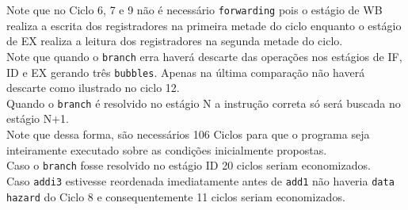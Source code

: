 \documentclass{article}
\begin{document}
Note que no Ciclo 6, 7 e 9 não é necessário \texttt{forwarding} pois o estágio de WB realiza a escrita dos registradores na primeira metade do ciclo enquanto o estágio de EX realiza a leitura dos registradores na segunda metade do ciclo.\\

\noindent Note que quando o \texttt{branch} erra haverá descarte das operações nos estágios de IF, ID e EX gerando três \texttt{bubbles}. Apenas na última comparação não haverá descarte como ilustrado no ciclo 12.\\

\noindent Quando o \texttt{branch} é resolvido no estágio N a instrução correta só será buscada no estágio N+1.\\

\noindent Note que dessa forma, são necessários 106 Ciclos para que o programa seja inteiramente executado sobre as condições inicialmente propostas.\\

\noindent Caso o \texttt{branch} fosse resolvido no estágio ID 20 ciclos seriam economizados.\\

\noindent Caso \texttt{addi3} estivesse reordenada imediatamente antes de \texttt{add1} não haveria \texttt{data hazard} do Ciclo 8 e consequentemente 11 ciclos seriam economizados.\\
\end{document}

